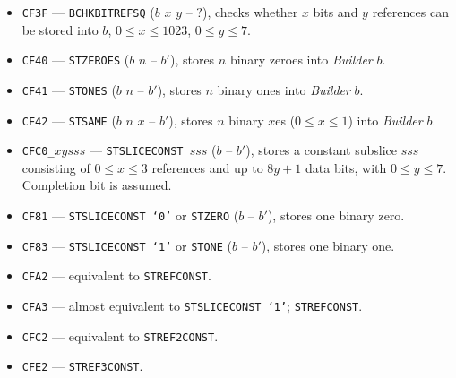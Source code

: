 \documentclass[12pt,oneside]{article}
\begin{document}
\begin{itemize}
\item {\tt CF3F} --- {\tt BCHKBITREFSQ} ($b$ $x$ $y$ -- $?$), checks whether $x$ bits and $y$ references can be stored into $b$, $0\leq x\leq 1023$, $0\leq y\leq 7$.
\item {\tt CF40} --- {\tt STZEROES} ($b$ $n$ -- $b'$), stores $n$ binary zeroes into {\em Builder} $b$.
\item {\tt CF41} --- {\tt STONES} ($b$ $n$ -- $b'$), stores $n$ binary ones into {\em Builder} $b$.
\item {\tt CF42} --- {\tt STSAME} ($b$ $n$ $x$ -- $b'$), stores $n$ binary $x$es ($0\leq x\leq1$) into {\em Builder} $b$.
\item {\tt CFC0\_$xysss$} --- {\tt STSLICECONST $sss$} ($b$ -- $b'$), stores a constant subslice $sss$ consisting of $0\leq x\leq 3$ references and up to $8y+1$ data bits, with $0\leq y\leq 7$. Completion bit is assumed.
\item {\tt CF81} --- {\tt STSLICECONST `0'} or {\tt STZERO} ($b$ -- $b'$), stores one binary zero.
\item {\tt CF83} --- {\tt STSLICECONST `1'} or {\tt STONE} ($b$ -- $b'$), stores one binary one.
\item {\tt CFA2} --- equivalent to {\tt STREFCONST}.
\item {\tt CFA3} --- almost equivalent to {\tt STSLICECONST `1'}; {\tt STREFCONST}.
\item {\tt CFC2} --- equivalent to {\tt STREF2CONST}.
\item {\tt CFE2} --- {\tt STREF3CONST}.
\end{itemize}
\end{document}
